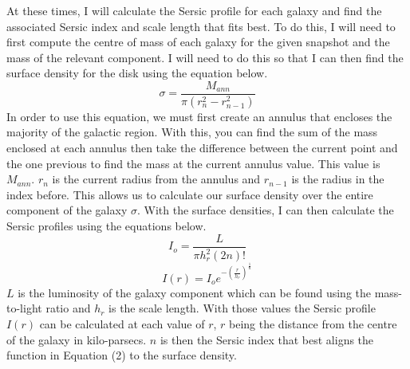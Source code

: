 \documentclass[linenumbers,trackchanges,twocolumn]{aastex7}
\begin{document}
At these times, I will calculate the Sersic profile for each galaxy
and find the associated Sersic index and scale length that fits best. To do this, I
will need to first compute the centre of mass of each galaxy for the
given snapshot and the mass of the relevant component. I will need
to do this so that I can then find the surface density for the disk
using the equation below.
\begin{equation}
\sigma=\frac{M_{ann}}{\pi(r_n^2-r_{n-1}^2)}
\end{equation}
In order to use this equation, we must first create an annulus that
encloses the majority of the galactic region. With this, you can find
the sum of the mass enclosed at each annulus then take the difference
between the current point and the one previous to find the mass at the
current annulus value. This value is \begin{math}M_{ann}\end{math}.
\begin{math}r_{n}\end{math} is the current radius from the annulus and
\begin{math}r_{n-1}\end{math} is the radius in the index before. This
allows us to calculate our surface density over the entire component of
the galaxy \begin{math}\sigma\end{math}. With the surface densities, I
can then calculate the Sersic profiles using the equations below.
\begin{equation}
I_o=\frac{L}{\pi h_r^2(2n)!}
\end{equation}
\begin{equation}
I(r)=I_oe^{-(\frac{r}{h_r})^\frac{1}{n}}
\end{equation}
\begin{math}L\end{math} is the luminosity of the galaxy component which
can be found using the mass-to-light ratio and
\begin{math}h_r\end{math} is the scale length. With those values
the Sersic profile \begin{math}I(r)\end{math} can be calculated at
each value of \begin{math}r\end{math}, \begin{math}r\end{math} being
the distance from the centre of the galaxy in kilo-parsecs.
\begin{math}n\end{math} is then the Sersic index that best aligns the
function in Equation (2) to the surface density.
\end{document}
